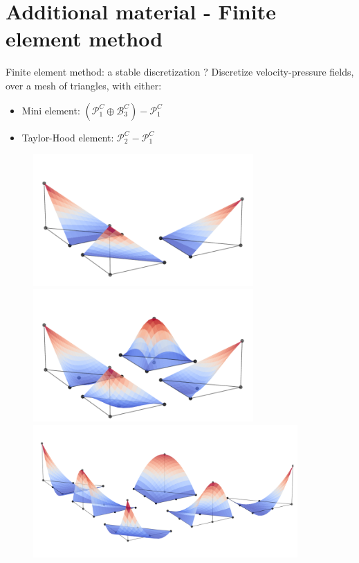 \documentclass{beamer}  %
\begin{document}
\section*{Additional material - Finite element method}
\begin{frame}{Finite element method: a stable discretization ?}
    Discretize velocity-pressure fields, over a mesh of triangles, with either:
    \begin{itemize}
        \item Mini element: $(\mathcal{P}_1^C\oplus \mathcal{B}_3^C) - \mathcal{P}_1^C$
        \item Taylor-Hood element: $\mathcal{P}_2^C - \mathcal{P}_1^C$
    \end{itemize}
    \begin{figure}
        \begin{overprint}
            \centering
            \includegraphics[width=0.75\textwidth]{../figures/shape_fcts_2d_P1.pdf}
            \centering
            \includegraphics[width=0.75\textwidth]{../figures/shape_fcts_2d_bubble.pdf}
            \centering
            \includegraphics[width=0.90\textwidth]{../figures/shape_fcts_2d_P2.pdf}
        \end{overprint}
    \end{figure}
\end{frame}
\end{document}
